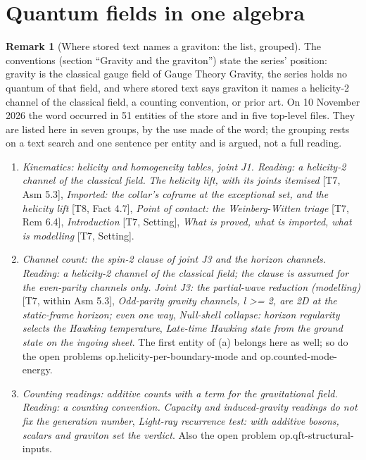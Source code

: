 \documentclass[11pt]{article}
\theoremstyle{definition}
\newtheorem{remark}[theorem]{Remark}
\theoremstyle{plain}
\newcommand{\changedmark}[2]{\marginpar{\raggedright\scriptsize\color{#1}#2}}
\begin{document}
\section{Quantum fields in one algebra}

\begin{remark}[Where stored text names a graviton: the list, grouped]\label{c:note.synthesis.where-stored-text-names-a-graviton}
\changedmark{MidnightBlue}{added since the deposit}
The conventions (section ``Gravity and the graviton'') state the series' position: gravity is the classical gauge field of Gauge Theory Gravity, the series holds no quantum of that field, and where stored text says graviton it names a helicity-2 channel of the classical field, a counting convention, or prior art. On 10 November 2026 the word occurred in 51 entities of the store and in five top-level files. They are listed here in seven groups, by the use made of the word; the grouping rests on a text search and one sentence per entity and is argued, not a full reading.
\begin{enumerate}
\item[(a)] \emph{Kinematics: helicity and homogeneity tables, joint J1. Reading: a helicity-2 channel of the classical field.} \emph{The helicity lift, with its joints itemised} [T7, Asm 5.3], \emph{Imported: the collar's coframe at the exceptional set, and the helicity lift} [T8, Fact 4.7], \emph{Point of contact: the Weinberg-Witten triage} [T7, Rem 6.4], \emph{Introduction} [T7, Setting], \emph{What is proved, what is imported, what is modelling} [T7, Setting].
\item[(b)] \emph{Channel count: the spin-2 clause of joint J3 and the horizon channels. Reading: a helicity-2 channel of the classical field; the clause is assumed for the even-parity channels only.} \emph{Joint J3: the partial-wave reduction (modelling)} [T7, within Asm 5.3], \emph{Odd-parity gravity channels, l >= 2, are 2D at the static-frame horizon; even one way}, \emph{Null-shell collapse: horizon regularity selects the Hawking temperature}, \emph{Late-time Hawking state from the ground state on the ingoing sheet}. The first entity of (a) belongs here as well; so do the open problems op.helicity-per-boundary-mode and op.counted-mode-energy.
\item[(c)] \emph{Counting readings: additive counts with a term for the gravitational field. Reading: a counting convention.} \emph{Capacity and induced-gravity readings do not fix the generation number}, \emph{Light-ray recurrence test: with additive bosons, scalars and graviton set the verdict}. Also the open problem op.qft-structural-inputs.

\end{enumerate}
\end{remark}
\end{document}
